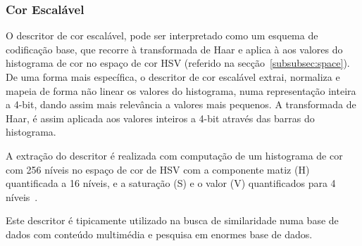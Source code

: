 \subsubsection{Cor Escalável}

O descritor de cor escalável, pode ser interpretado como um esquema de codificação base, que recorre à transformada de Haar e aplica à aos valores do histograma de cor no espaço de cor HSV (referido na secção~\ref{subsubsec:space}). De uma forma mais específica, o descritor de cor escalável extrai, normaliza e mapeia de forma não linear os valores do histograma, numa representação inteira a 4-bit, dando assim mais relevância a valores mais pequenos. A transformada de Haar, é assim aplicada aos valores inteiros a 4-bit através das barras do histograma. 

A extração do descritor é realizada com computação de um histograma de cor com 256 níveis no espaço de cor de HSV com a componente matiz (H) quantificada a 16 níveis, e a saturação (S) e o valor (V) quantificados para 4 níveis~\cite{Christopoulos2000}. 

Este descritor é tipicamente utilizado na busca de similaridade numa base de dados com conteúdo multimédia e pesquisa em enormes base de dados. 

%
%
%

